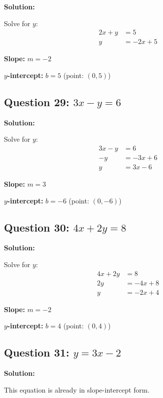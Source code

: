 \documentclass[12pt]{article}
\begin{document}
\noindent\textbf{Solution:}

Solve for $y$:
\begin{align*}
2x + y &= 5 \\
y &= -2x + 5
\end{align*}

\textbf{Slope: } $m = -2$

\textbf{$y$-intercept: } $b = 5$ (point: $(0, 5)$)

\vspace{0.3cm}

\subsection*{Question 29: $3x - y = 6$}

\noindent\textbf{Solution:}

Solve for $y$:
\begin{align*}
3x - y &= 6 \\
-y &= -3x + 6 \\
y &= 3x - 6
\end{align*}

\textbf{Slope: } $m = 3$

\textbf{$y$-intercept: } $b = -6$ (point: $(0, -6)$)

\vspace{0.3cm}

\subsection*{Question 30: $4x + 2y = 8$}

\noindent\textbf{Solution:}

Solve for $y$:
\begin{align*}
4x + 2y &= 8 \\
2y &= -4x + 8 \\
y &= -2x + 4
\end{align*}

\textbf{Slope: } $m = -2$

\textbf{$y$-intercept: } $b = 4$ (point: $(0, 4)$)

\vspace{0.3cm}

\subsection*{Question 31: $y = 3x - 2$}

\noindent\textbf{Solution:}

This equation is already in slope-intercept form.
\end{document}
